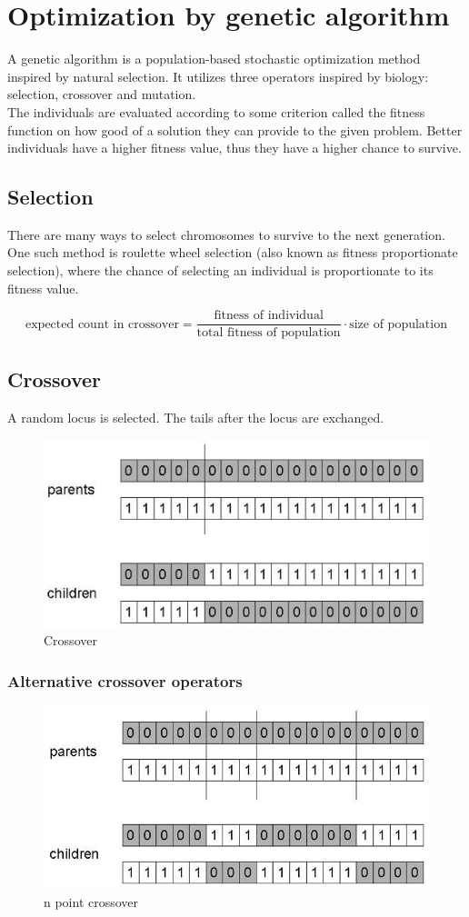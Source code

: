 \documentclass[a4paper,12pt,answers]{article}
\begin{document}
	
	
	\section{Optimization by genetic algorithm}
	A genetic algorithm is a population-based stochastic optimization method inspired by natural selection. It utilizes three operators inspired by biology: selection, crossover and mutation.
	\\[4pt]
	\noindent
	The individuals are evaluated according to some criterion called the fitness function on how good of a solution they can provide to the given problem. Better individuals have a higher fitness value, thus they have a higher chance to survive.
	
	
	\subsection{Selection}
	There are many ways to select chromosomes to survive to the next generation. One such method is roulette wheel selection (also known as fitness proportionate selection), where the chance of selecting an individual is proportionate to its fitness value.
	
	\[
	\text{expected count in crossover} = \frac{\text{fitness of individual}}{\text{total fitness of population}} \cdot \text{size of population}
	\]
	
	\subsection{Crossover}
	A random locus is selected. The tails after the locus are exchanged.
	\begin{figure}[H]
		\centering
		\includegraphics[width=0.7\linewidth]{crossover}
		\caption{Crossover}
		\label{fig:crossover}
	\end{figure}
	
	\subsubsection{Alternative crossover operators}
	\begin{figure}[H]
		\centering
		\includegraphics[width=0.7\linewidth]{npoint_cross}
		\caption{n point crossover}
		\label{fig:npointcross}
	\end{figure}
	
\end{document}
